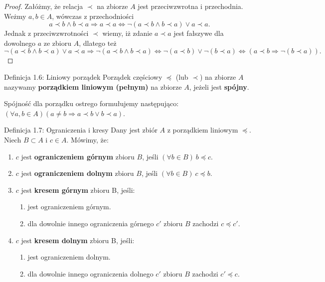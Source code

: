 \documentclass{article}
\newcommand{\ifff}{\Leftrightarrow}
\newcommand{\imp}{\Rightarrow}
\begin{document}
\begin{proof}
    Załóżmy, że relacja $\prec$ na zbiorze $A$ jest przeciwzwrotna i przechodnia. Weżmy $a, b\in A$,
    wówczas z przechodniości
    \begin{equation*}
        a \prec b \land b \prec a \imp a \prec a \ifff \lnot(a \prec b \land b \prec a) \lor a \prec a.
    \end{equation*}
    Jednak z przeciwzwrotności $\prec$ wiemy, iż zdanie $a\prec a$ jest fałszywe dla dowolnego $a$ ze
    zbioru $A$, dlatego też
    \begin{equation*}
        \lnot(a \prec b \land b \prec a) \lor a \prec a \imp \lnot(a \prec b \land b \prec a)\ifff
        \lnot (a \prec b) \lor \lnot (b \prec a) \ifff (a\prec b\imp \lnot(b\prec a)).
    \end{equation*}
\end{proof}

\begin{defr}{Definicja 1.6: Liniowy porządek}
    Porządek częściowy $\preceq$ (lub $\prec$) na zbiorze $A$ nazywamy \textbf{porządkiem liniowym (pełnym)}
    na zbiorze $A$, jeżeli jest \textbf{spójny}.
\end{defr}

Spójność dla porządku ostrego formułujemy następująco: $(\forall a,b\in A)(a\ne b\imp a\prec b \lor b\prec a)$.

\begin{defr}{Definicja 1.7: Ograniczenia i kresy}
    Dany jest zbiór $A$ z porządkiem liniowym $\preceq$. Niech $B\subset A$ i $c\in A$. Mówimy, że:
    \begin{enumerate}[label=\Roman*.]
        \item $c$ jest \textbf{ograniczeniem górnym} zbioru $B$, jeśli $(\forall b\in B)\ b \preceq c.$
        \item $c$ jest \textbf{ograniczeniem dolnym} zbioru $B$, jeśli $(\forall b\in B)\ c \preceq b.$
        \item $c$  jest \textbf{kresem górnym} zbioru B, jeśli:
            \begin{enumerate}
            \item jest ograniczeniem górnym.
            \item dla dowolnie innego ograniczenia górnego $c'$ zbioru $B$ zachodzi $c\preceq c'$.
            \end{enumerate}
        \item $c$  jest \textbf{kresem dolnym} zbioru B, jeśli:
            \begin{enumerate}
            \item jest ograniczeniem dolnym.
            \item dla dowolnie innego ograniczenia dolnego $c'$ zbioru $B$ zachodzi $c'\preceq c$.
            \end{enumerate}
    \end{enumerate}
\end{defr}
\end{document}
